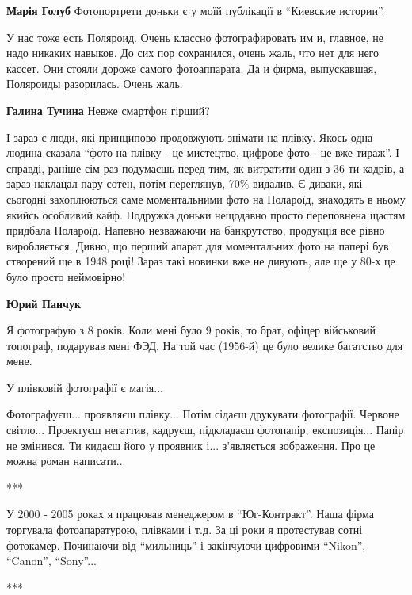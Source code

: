 \begin{itemize}
\begin{itemize}
\textbf{Марія Голуб} Фотопортрети доньки є у моїй публікації в \enquote{Киевские истории}.
\end{itemize} %


У нас тоже есть Поляроид. Очень классно фотографировать им и, главное, не надо
никаких навыков. До сих пор сохранился, очень жаль, что нет для него кассет. Они
стояли дороже самого фотоаппарата. Да и фирма, выпускавшая, Поляроиды
разорилась. Очень жаль.

\textbf{Галина Тучина} Невже смартфон гірший?


І зараз є люди, які принципово продовжують знімати на плівку. Якось одна людина
сказала \enquote{фото на плівку - це мистецтво, цифрове фото - це вже тираж}. І
справді, раніше сім раз подумаєшь перед тим, як витратити один з 36-ти кадрів,
а зараз наклацал пару сотен, потім переглянув, 70\% видалив. Є диваки, які
сьогодні захоплюються саме моментальними фото на Полароїд, знаходять в ньому
якийсь особливий кайф. Подружка доньки нещодавно просто переповнена щастям
придбала Полароїд. Напевно незважаючи на банкрутство, продукція все рівно
виробляється. Дивно, що перший апарат для моментальних фото на папері був
створений ще в 1948 році! Зараз такі новинки вже не дивують, але ще у 80-х це
було просто неймовірно!

\begin{itemize} %
\textbf{Юрий Панчук} 

Я фотографую з 8 років. Коли мені було 9 років, то брат, офіцер військовий
топограф, подарував мені ФЭД. На той час (1956-й) це було велике багатство для
мене.

У плівковій фотографії є магія...

Фотографуєш... проявляєш плівку... Потім сідаєш друкувати фотографії. Червоне
світло... Проектуєш негаттив, кадруєш, підкладаєш фотопапір, експозиція...
Папір не змінився. Ти кидаєш його у проявник і... з'являється зображення. Про
це можна роман написати...

***

У 2000 - 2005 роках я працював менеджером в \enquote{Юг-Контракт}. Наша фірма
торгувала фотоапаратурою, плівками і т.д. За ці роки я протестував сотні
фотокамер.  Починаючи від \enquote{мильниць} і закінчуючи цифровими
\enquote{Nikon}, \enquote{Canon}, \enquote{Sony}...

***


\end{itemize}
\end{itemize}
